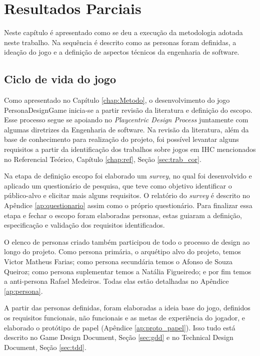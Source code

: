 \chapter{Resultados Parciais}
\label{chap:des}

Neste capítulo é apresentado como se deu a execução da metodologia adotada neste trabalho. Na sequência é descrito como as personas foram definidas, a ideação do jogo e a definição de aspectos técnicos da engenharia de software.

\section{Ciclo de vida do jogo}

Como apresentado no Capítulo \ref{chap:Metodo}, o desenvolvimento do jogo PersonaDesignGame inicia-se a partir revisão da literatura e definição do escopo. Esse processo segue se apoiando no \textit{Playcentric Design Process} juntamente com algumas diretrizes da Engenharia de software. Na revisão da literatura, além da base de conhecimento para realização do projeto, foi possível levantar alguns requisitos a partir da identificação dos trabalhos sobre jogos em IHC mencionados no Referencial Teórico, Capítulo \ref{chap:ref}, Seção \ref{sec:trab_cor}. 

Na etapa de definição escopo foi elaborado um \textit{survey}, no qual foi desenvolvido e aplicado um questionário de pesquisa, que teve como objetivo identificar o público-alvo e elicitar mais alguns requisitos. O relatório do \textit{survey} é descrito no Apêndice \ref{ap:questionario} assim como o próprio questionário. Para finalizar essa etapa e fechar o escopo foram elaboradas personas, estas guiaram a definição, especificação e validação dos requisitos identificados.

O elenco de personas criado também participou de todo o processo de design ao longo do projeto. Como persona primária, o arquétipo alvo do projeto, temos Victor Matheus Farias; como persona secundária temos o Afonso de Souza Queiroz; como persona suplementar temos a Natália Figueiredo; e por fim temos a anti-persona Rafael Medeiros. Todas elas estão detalhadas no Apêndice \ref{ap:persona}.%

A partir das personas definidas, foram elaboradas a ideia base do jogo, definidos os requisitos funcionais, não funcionais e as metas de experiência do jogador, e elaborado o protótipo de papel (Apêndice \ref{ap:proto_papel}). Isso tudo está descrito no Game Design Document, Seção \ref{sec:gdd} e no Technical Design Document, Seção \ref{sec:tdd}.

